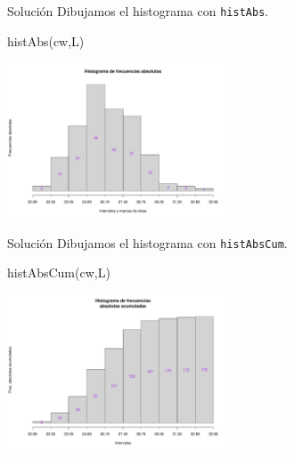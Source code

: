 \documentclass[
  ignorenonframetext,
  aspectratio=169]{beamer}
\newenvironment{Shaded}{\begin{snugshade}}{\end{snugshade}}
\newcommand{\FunctionTok}[1]{\textcolor[rgb]{0.00,0.00,0.00}{#1}}
\newcommand{\NormalTok}[1]{#1}
\begin{document}
\begin{frame}[fragile]{Solución}
\protect\hypertarget{soluciuxf3n-40}{}
Dibujamos el histograma con \texttt{histAbs}.

\begin{Shaded}
\begin{Highlighting}[]
\FunctionTok{histAbs}\NormalTok{(cw,L)}
\end{Highlighting}
\end{Shaded}

\begin{center}\includegraphics[width=250px]{Hora6_files/figure-beamer/unnamed-chunk-58-1} \end{center}
\end{frame}

\begin{frame}[fragile]{Solución}
\protect\hypertarget{soluciuxf3n-41}{}
Dibujamos el histograma con \texttt{histAbsCum}.

\begin{Shaded}
\begin{Highlighting}[]
\FunctionTok{histAbsCum}\NormalTok{(cw,L)}
\end{Highlighting}
\end{Shaded}

\begin{center}\includegraphics[width=250px]{Hora6_files/figure-beamer/unnamed-chunk-59-1} \end{center}
\end{frame}
\end{document}
